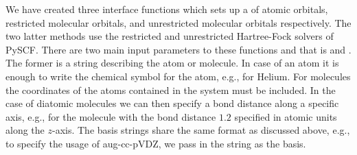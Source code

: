        We have created three interface functions which sets up a
         of atomic orbitals, restricted molecular orbitals,
        and unrestricted molecular orbitals respectively.
        The two latter methods use the restricted and unrestricted Hartree-Fock
        solvers of PySCF.
        There are two main input parameters to these functions and that is
         and .
        The former is a string describing the atom or molecule.
        In case of an atom it is enough to write the chemical symbol for the
        atom, e.g.,  for Helium.
        For molecules the coordinates of the atoms contained in the system must
        be included.
        In the case of diatomic molecules we can then specify a bond distance
        along a specific axis, e.g.,  for the
         molecule with the bond distance $1.2$ specified in atomic units
        along the $z$-axis.
        The basis strings share the same format as discussed above, e.g., to
        specify the usage of aug-cc-pVDZ, we pass in the string
         as the basis.


